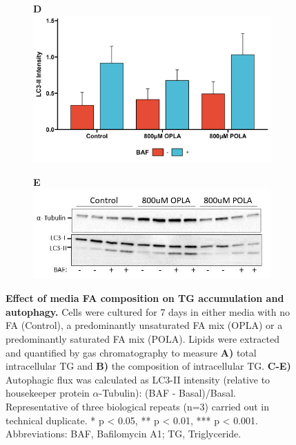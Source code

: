 \begin{figure}[h!]
\begin{subfigure}[b]{0.49\textwidth}
     \end{subfigure}
     \hfill
       \begin{subfigure}[b]{0.49\textwidth}
       \textbf{D}
         \centering
         \includegraphics[width=\textwidth]{figures/ch3-Model Development/OPLAPOLA BAF.png}
     \end{subfigure}
     \hfill
       \begin{subfigure}[b]{0.6\textwidth}
       \textbf{E}
         \centering
         \includegraphics[width=\textwidth]{figures/ch3-Model Development/OPLAPOLA WB Photo.jpg}
     \end{subfigure}
     \hfill
        \caption{\textbf{Effect of media FA composition on TG accumulation and autophagy.} Cells were cultured for 7 days in either media with no FA (Control), a predominantly unsaturated FA mix (OPLA) or a predominantly saturated FA mix (POLA). Lipids were extracted and quantified by gas chromatography to measure \textbf{A)} total intracellular TG and \textbf{B)} the composition of intracellular TG. \textbf{C-E)} Autophagic flux was calculated as LC3-II intensity (relative to housekeeper protein $\alpha$-Tubulin): (BAF - Basal)/Basal. Representative of three biological repeats (n=3) carried out in technical duplicate. * p < 0.05, ** p < 0.01, *** p < 0.001. Abbreviations: BAF, Bafilomycin A1; TG, Triglyceride.}
        \label{fig:OPLAPOLA}
\end{figure}